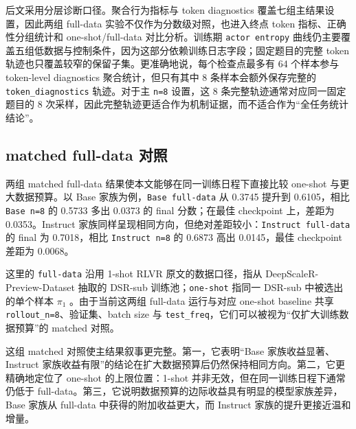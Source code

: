 \documentclass[12pt,a4paper]{ctexart}
\begin{document}
后文采用分层诊断口径。聚合行为指标与 token diagnostics 覆盖七组主结果设置，因此两组 full-data 实验不仅作为分数级对照，也进入终点 token 指标、正确性分组统计和 one-shot/full-data 对比分析。训练期 \texttt{actor entropy} 曲线仍主要覆盖五组低数据与控制条件，因为这部分依赖训练日志字段；固定题目的完整 token 轨迹也只覆盖较窄的保留子集。更准确地说，每个检查点最多有 64 个样本参与 token-level diagnostics 聚合统计，但只有其中 8 条样本会额外保存完整的 \texttt{token\_diagnostics} 轨迹。对于主 \texttt{n=8} 设置，这 8 条完整轨迹通常对应同一固定题目的 8 次采样，因此完整轨迹更适合作为机制证据，而不适合作为“全任务统计结论”。

\subsection{matched full-data 对照}

两组 matched full-data 结果使本文能够在同一训练日程下直接比较 one-shot 与更大数据预算。以 Base 家族为例，\texttt{Base full-data} 从 0.3745 提升到 0.6105，相比 \texttt{Base n=8} 的 0.5733 多出 0.0373 的 final 分数；在最佳 checkpoint 上，差距为 0.0353。Instruct 家族同样呈现相同方向，但绝对差距较小：\texttt{Instruct full-data} 的 final 为 0.7018，相比 \texttt{Instruct n=8} 的 0.6873 高出 0.0145，最佳 checkpoint 差距为 0.0068。

这里的 \texttt{full-data} 沿用 1-shot RLVR 原文的数据口径，指从 DeepScaleR-Preview-Dataset 抽取的 DSR-sub 训练池；\texttt{one-shot} 指同一 DSR-sub 中被选出的单个样本 \(\pi_1\) \cite{wang2025oneshotrlvr,deepscaler2025}。由于当前这两组 full-data 运行与对应 one-shot baseline 共享 \texttt{rollout\_n=8}、验证集、batch size 与 \texttt{test\_freq}，它们可以被视为“仅扩大训练数据预算”的 matched 对照。

这组 matched 对照使主结果叙事更完整。第一，它表明“Base 家族收益显著、Instruct 家族收益有限”的结论在扩大数据预算后仍然保持相同方向。第二，它更精确地定位了 one-shot 的上限位置：1-shot 并非无效，但在同一训练日程下通常仍低于 full-data。第三，它说明数据预算的边际收益具有明显的模型家族差异，Base 家族从 full-data 中获得的附加收益更大，而 Instruct 家族的提升更接近温和增量。
\end{document}
